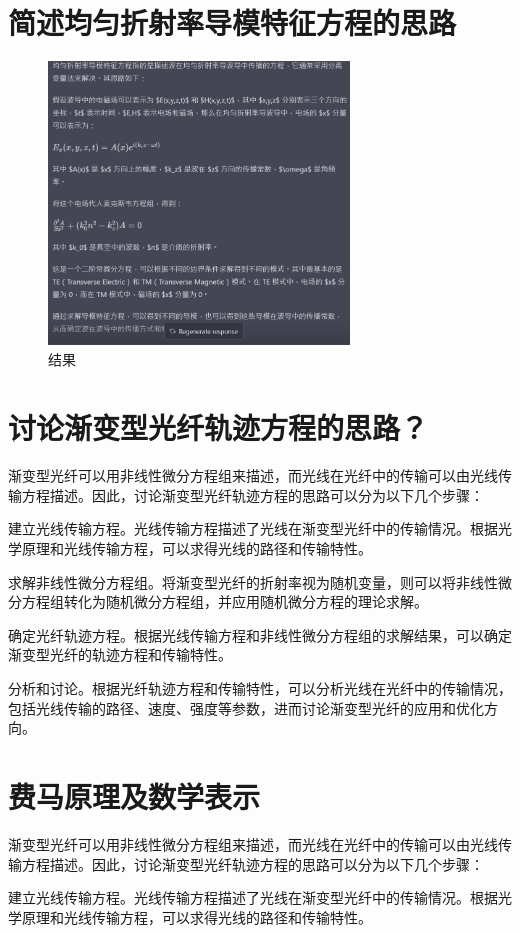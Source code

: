 \documentclass[12pt, a4paper, oneside]{article}
\begin{document}
\begin{spacing}{2.0}
\section{简述均匀折射率导模特征方程的思路}
\begin{figure}[htbp][H]
    \centering
    \includegraphics[width=8cm]{A.jpg}
    \caption{结果}
\end{figure}
\section{讨论渐变型光纤轨迹方程的思路？}
渐变型光纤可以用非线性微分方程组来描述，而光线在光纤中的传输可以由光线传输方程描述。因此，讨论渐变型光纤轨迹方程的思路可以分为以下几个步骤：

建立光线传输方程。光线传输方程描述了光线在渐变型光纤中的传输情况。根据光学原理和光线传输方程，可以求得光线的路径和传输特性。

求解非线性微分方程组。将渐变型光纤的折射率视为随机变量，则可以将非线性微分方程组转化为随机微分方程组，并应用随机微分方程的理论求解。

确定光纤轨迹方程。根据光线传输方程和非线性微分方程组的求解结果，可以确定渐变型光纤的轨迹方程和传输特性。

分析和讨论。根据光纤轨迹方程和传输特性，可以分析光线在光纤中的传输情况，包括光线传输的路径、速度、强度等参数，进而讨论渐变型光纤的应用和优化方向。


\section{费马原理及数学表示}

渐变型光纤可以用非线性微分方程组来描述，而光线在光纤中的传输可以由光线传输方程描述。因此，讨论渐变型光纤轨迹方程的思路可以分为以下几个步骤：

建立光线传输方程。光线传输方程描述了光线在渐变型光纤中的传输情况。根据光学原理和光线传输方程，可以求得光线的路径和传输特性。


\end{spacing}
\end{document}
